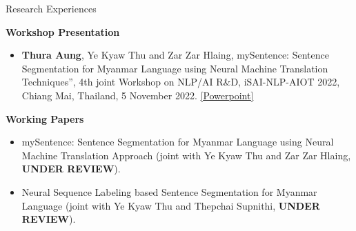 \documentclass{resume} %
\begin{document}

\begin{rSection}{Research Experiences}

 \textbf{Workshop Presentation} 
 \begin{itemize}
 \item \textbf{Thura Aung}, Ye Kyaw Thu and Zar Zar Hlaing, mySentence: Sentence Segmentation for Myanmar Language using Neural Machine Translation Techniques”, 4th joint Workshop on NLP/AI R\&D, iSAI-NLP-AIOT 2022, Chiang Mai, Thailand, 5 November 2022. \href{https://docs.google.com/presentation/d/1fm-yRGZVuR2sOpK8M4ldtiLB7QU2T96a0GofIaVyFC0/present?slide=id.p}{[\underline{Powerpoint}]}
\end{itemize}
  
 \textbf{Working Papers} 
 \begin{itemize}
 \item mySentence: Sentence Segmentation for Myanmar Language using Neural Machine Translation Approach (joint with Ye Kyaw Thu and Zar Zar Hlaing, \textbf{UNDER REVIEW}).
\item Neural Sequence Labeling based Sentence Segmentation for Myanmar Language (joint with Ye Kyaw Thu and Thepchai Supnithi, \textbf{UNDER REVIEW}).
\end{itemize}

\end{rSection}
\end{document}
